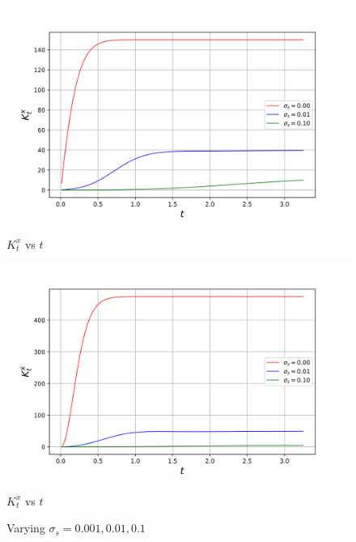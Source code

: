 \begin{figure}[H]
    \centering
    \begin{minipage}{0.491\linewidth}
        \centering
        \includegraphics[width=\linewidth]{plots/part1-e.2-kx.png}
        \caption*{$K^x_t$ vs $t$}

    \end{minipage}
    \hfill
    \begin{minipage}{0.49\linewidth}
        \centering
        \includegraphics[width=\linewidth]{plots/part1-e.2-kv.png}
         \caption*{$K^{\dot{x}}_t$ vs $t$}
    \end{minipage}
    \caption{Varying $\sigma_s = 0.001, 0.01, 0.1$}
    \label{fig:part1-gain_sigma_s}
\end{figure}



